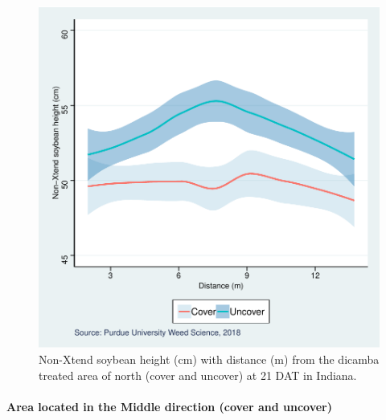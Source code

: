 \documentclass[]{article}
\let\oldparagraph\paragraph
\renewcommand{\paragraph}[1]{\oldparagraph{#1}\mbox{}}
\begin{document}
\begin{figure}
\centering
\includegraphics{Report_files/figure-latex/unnamed-chunk-39-1.pdf}
\caption{Non-Xtend soybean height (cm) with distance (m) from the
dicamba treated area of north (cover and uncover) at 21 DAT in Indiana.}
\end{figure}

\pagebreak
\newpage

\paragraph{\texorpdfstring{Area located in the \textbf{Middle} direction
(cover and
uncover)}{Area located in the Middle direction (cover and uncover)}}\label{area-located-in-the-middle-direction-cover-and-uncover}
\end{document}
